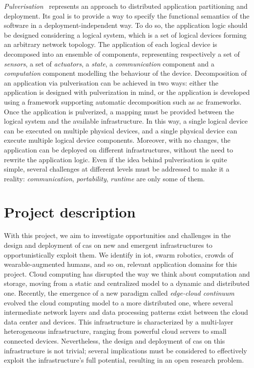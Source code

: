 \documentclass[12pt]{article}
\begin{document}
\emph{Pulverisation}~\cite{DBLP:journals/fi/CasadeiPPVW20} represents an approach to distributed application partitioning and deployment.
%
Its goal is to provide a way to specify the functional semantics of the software in a deployment-independent way.
%
To do so,
the application logic should be designed considering a logical system,
which is a set of logical devices forming an arbitrary network topology.
%
The application of each logical device is decomposed into an ensemble of components,
representing respectively a set of \emph{sensors},
a set of \emph{actuators},
a \emph{state},
a \emph{communication} component and a \emph{computation} component modelling the behaviour of the device.
%
Decomposition of an application via pulverisation can be achieved in two ways:
either the application is designed with pulverization in mind,
or the application is developed using a framework supporting automatic decomposition such as \ac{ac} frameworks.
%
Once the application is pulverized,
a mapping must be provided between the logical system and the available infrastructure.
%
In this way,
a single logical device can be executed on multiple physical devices,
and a single physical device can execute multiple logical device components.
%
Moreover,
with no changes,
the application can be deployed on different infrastructures,
without the need to rewrite the application logic.
%
Even if the idea behind pulverisation is quite simple,
several challenges at different levels must be addressed to make it a reality:
\emph{communication}, \emph{portability}, \emph{runtime} are only some of them.


\section{Project description}\label{sec:project-description}

With this project,
we aim to investigate opportunities and challenges in the design and deployment of
\ac{cas} on new and emergent infrastructures to opportunistically exploit them.
%
We identify in \ac{iot}, swarm robotics, crowds of wearable-augmented humans, and so on,
relevant application domains for this project.
%
Cloud computing has disrupted the way we think about computation and storage,
moving from a static and centralized model to a dynamic and distributed one.
%
Recently,
the emergence of a new paradigm called \emph{edge-cloud continuum}~\cite{DBLP:journals/iot/BittencourtISFM18}
evolved the cloud computing model to a more distributed one,
where several intermediate network layers and data processing patterns exist between the cloud data center and devices.
%
This infrastructure is characterized by a multi-layer heterogeneous infrastructure,
ranging from powerful cloud servers to small connected devices.
%
Nevertheless,
the design and deployment of \ac{cas} on this infrastructure is not trivial;
several implications must be considered to effectively exploit the infrastructure's full potential,
resulting in an open research problem.
\end{document}
